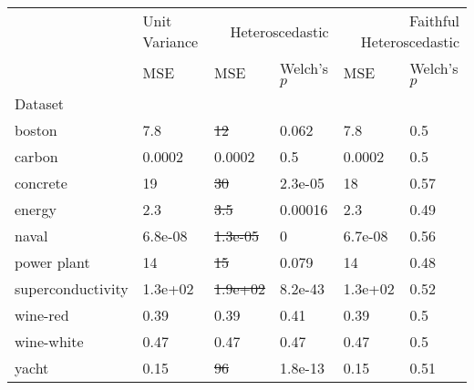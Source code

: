 \begin{tabular}{l|l|ll|ll}
\toprule
 & Unit Variance & \multicolumn{2}{r}{Heteroscedastic} & \multicolumn{2}{r}{Faithful Heteroscedastic} \\
 & MSE & MSE & Welch's $p$ & MSE & Welch's $p$ \\
Dataset &  &  &  &  &  \\
\midrule
boston & 7.8 & \sout{12} & 0.062 & 7.8 & 0.5 \\
carbon & 0.0002 & 0.0002 & 0.5 & 0.0002 & 0.5 \\
concrete & 19 & \sout{30} & 2.3e-05 & 18 & 0.57 \\
energy & 2.3 & \sout{3.5} & 0.00016 & 2.3 & 0.49 \\
naval & 6.8e-08 & \sout{1.3e-05} & 0 & 6.7e-08 & 0.56 \\
power plant & 14 & \sout{15} & 0.079 & 14 & 0.48 \\
superconductivity & 1.3e+02 & \sout{1.9e+02} & 8.2e-43 & 1.3e+02 & 0.52 \\
wine-red & 0.39 & 0.39 & 0.41 & 0.39 & 0.5 \\
wine-white & 0.47 & 0.47 & 0.47 & 0.47 & 0.5 \\
yacht & 0.15 & \sout{96} & 1.8e-13 & 0.15 & 0.51 \\
\bottomrule
\end{tabular}
